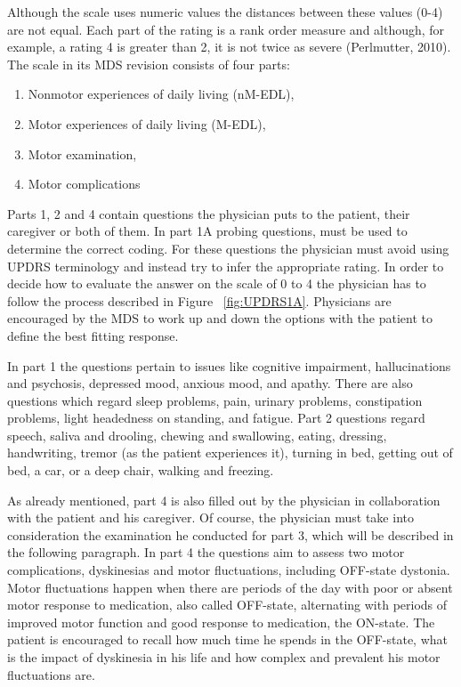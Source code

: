 Although the scale uses numeric values the distances between these values (0-4) are not equal. Each part of the rating is a rank order measure and although, for example, a rating 4 is greater than 2, it is not twice as severe (Perlmutter, 2010). The scale in its MDS revision consists of four parts:
\begin{enumerate}
\item Nonmotor experiences of daily living (nM-EDL),
\item Motor experiences of daily living (M-EDL),
\item Motor examination,
\item Motor complications
\end{enumerate}

Parts 1, 2 and 4 contain questions the physician puts to the patient, their caregiver or both of them. In part 1A probing questions, must be used to determine the correct coding. For these questions the physician must avoid using \gls{UPDRS} terminology and instead try to infer the appropriate rating. In order to decide how to evaluate the answer on the scale of 0 to 4 the physician has to follow the process described in Figure ~\ref{fig:UPDRS1A}. Physicians are encouraged by the MDS to work up and down the options with the patient to define the best fitting response.



In part 1 the questions pertain to issues like cognitive impairment, hallucinations and psychosis, depressed mood, anxious mood, and apathy. There are also questions which regard sleep problems, pain, urinary problems, constipation problems, light headedness on standing, and fatigue. Part 2 questions regard speech, saliva and drooling, chewing and swallowing, eating, dressing, handwriting, tremor (as the patient experiences it), turning in bed, getting out of bed, a car, or a deep chair, walking and freezing.

As already mentioned, part 4 is also filled out by the physician in collaboration with the patient and his caregiver. Of course, the physician must take into consideration the examination he conducted for part 3, which will be described in the following paragraph. In part 4 the questions aim to assess two motor complications, dyskinesias and motor fluctuations, including OFF-state dystonia. Motor fluctuations happen when there are periods of the day with poor or absent motor response to medication, also called OFF-state, alternating with periods of improved motor function and good response to medication, the ON-state. The patient is encouraged to recall how much time he spends in the OFF-state, what is the impact of dyskinesia in his life and how complex and prevalent his motor fluctuations are.

